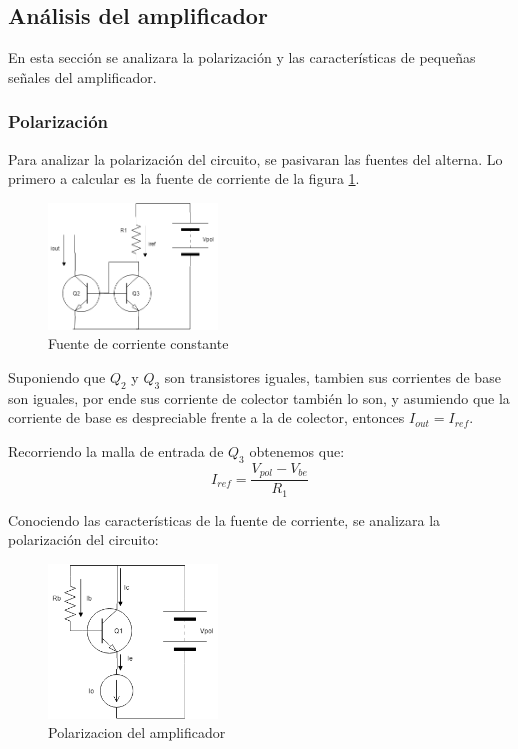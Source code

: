 \documentclass[../../main.tex]{subfiles}
\begin{document}
\subsection{Análisis del amplificador}
En esta sección se analizara la polarización y las características de pequeñas señales del amplificador.
\subsubsection{Polarización}
Para analizar la polarización del circuito, se pasivaran las fuentes del alterna. Lo primero a calcular es la fuente de corriente de la figura \ref{fig:ms}.

\begin{figure}[H]	
	\centering
	\includegraphics[width=0.4\textwidth]{imagenes/mirrorsource.png}
	\caption{Fuente de corriente constante}\label{fig:ms}
\end{figure}
Suponiendo que $Q_2$ y $Q_3$ son transistores iguales, tambien sus corrientes de base son iguales, por ende sus corriente de colector también lo son, y asumiendo que la corriente de base es despreciable frente a la de colector, entonces $I_{out}=I_{ref}$. 
\par Recorriendo la malla de entrada de $Q_3$ obtenemos que:
\begin{equation}
I_{ref}=\frac{V_{pol}-V_{be}}{R_1}\label{eq:mss}
\end{equation}

Conociendo las características de la fuente de corriente, se analizara la polarización del circuito:

\begin{figure}[H]	
	\centering
	\includegraphics[width=0.4\textwidth]{imagenes/pol.png}
	\caption{Polarizacion del amplificador}
\end{figure}
\end{document}
